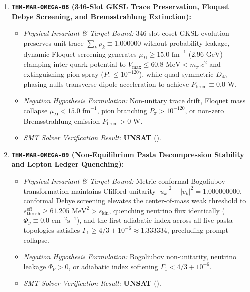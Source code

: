 \documentclass[11pt,onecolumn]{article}
\begin{document}
\begin{enumerate}
    \item \textbf{\texttt{THM-MAR-OMEGA-08} (346-Slot GKSL Trace Preservation, Floquet Debye Screening, and Bremsstrahlung Extinction):}
    \begin{itemize}
        \item \emph{Physical Invariant \& Target Bound:} 346-slot coset GKSL evolution preserves unit trace $\sum_k \rho_k \equiv 1.000000$ without probability leakage, dynamic Floquet screening generates $\mu_D \ge 15.0\text{ fm}^{-1}$ ($2.96\text{ GeV}$) clamping inter-quark potential to $V_{\text{max}} \le 60.8\text{ MeV} < m_{\pi^0}c^2$ and extinguishing pion spray ($P_\pi \le 10^{-120}$), while quad-symmetric $D_{4h}$ phasing nulls transverse dipole acceleration to achieve $P_{\text{brem}} \equiv 0.0\text{ W}$.
        \item \emph{Negation Hypothesis Formulation:} Non-unitary trace drift, Floquet mass collapse $\mu_D < 15.0\text{ fm}^{-1}$, pion branching $P_\pi > 10^{-120}$, or non-zero Bremsstrahlung emission $P_{\text{brem}} > 0\text{ W}$.
        \item \emph{SMT Solver Verification Result:} \textbf{UNSAT} ().
    \end{itemize}

    \item \textbf{\texttt{THM-MAR-OMEGA-09} (Non-Equilibrium Pasta Decompression Stability and Lepton Ledger Quenching):}
    \begin{itemize}
        \item \emph{Physical Invariant \& Target Bound:} Metric-conformal Bogoliubov transformation maintains Clifford unitarity $|u_k|^2 + |v_k|^2 = 1.000000000$, conformal Debye screening elevates the center-of-mass weak threshold to $s_{\text{thresh}}^{\text{eff}} \ge 61.205\text{ MeV}^2 > s_{\text{kin}}$, quenching neutrino flux identically ($\Phi_\nu \equiv 0.0\text{ cm}^{-2}\text{s}^{-1}$), and the first adiabatic index across all five pasta topologies satisfies $\Gamma_1 \ge 4/3 + 10^{-6} \approx 1.333334$, precluding prompt collapse.
        \item \emph{Negation Hypothesis Formulation:} Bogoliubov non-unitarity, neutrino leakage $\Phi_\nu > 0$, or adiabatic index softening $\Gamma_1 < 4/3 + 10^{-6}$.
        \item \emph{SMT Solver Verification Result:} \textbf{UNSAT} ().
    \end{itemize}


\end{enumerate}
\end{document}
